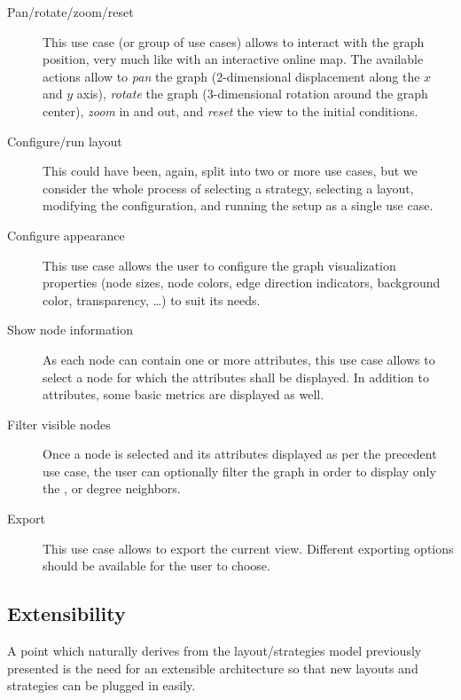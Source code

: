 \begin{description}
  \item[Pan/rotate/zoom/reset] This use case (or group of use cases) allows to interact with the graph position, very much like with an interactive online map. The available actions allow to \emph{pan} the graph (2-dimensional displacement along the $x$ and $y$ axis), \emph{rotate} the graph (3-dimensional rotation around the graph center), \emph{zoom} in and out, and \emph{reset} the view to the initial conditions.
  \item[Configure/run layout] This could have been, again, split into two or more use cases, but we consider the whole process of selecting a strategy, selecting a layout, modifying the configuration, and running the setup as a single use case.
  \item[Configure appearance] This use case allows the user to configure the graph visualization properties (node sizes, node colors, edge direction indicators, background color, transparency, \ldots) to suit its needs.
  \item[Show node information] As each node can contain one or more attributes, this use case allows to select a node for which the attributes shall be displayed. In addition to attributes, some basic metrics are displayed as well.
  \item[Filter visible nodes] Once a node is selected and its attributes displayed as per the precedent use case, the user can optionally filter the graph in order to display only the ,  or  degree neighbors.
  \item[Export] This use case allows to export the current view. Different exporting options should be available for the user to choose.
\end{description}

\subsection{Extensibility}

A point which naturally derives from the layout/strategies model previously presented is the need for an extensible architecture so that new layouts and strategies can be plugged in easily.

